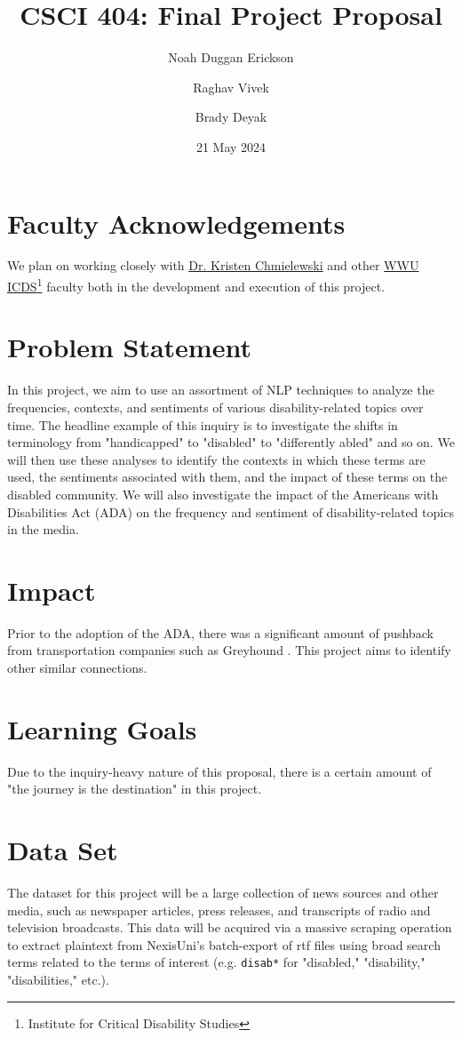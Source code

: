 \documentclass[letterpaper, twoside]{article}
\title{CSCI 404: Final Project Proposal}
\author{Noah Duggan Erickson \and Raghav Vivek \and Brady Deyak}
\date{21 May 2024}
\begin{document}
\maketitle

\section*{Faculty Acknowledgements}
We plan on working closely with \href{https://chss.wwu.edu/chmielk}{Dr. Kristen Chmielewski} and other \href{https://wp.wwu.edu/disabilitycollaborative/people/}{WWU ICDS\footnote{Institute for Critical Disability Studies} faculty} both in the development and execution of this project.

\section{Problem Statement}
In this project, we aim to use an assortment of NLP techniques to analyze the frequencies, contexts, and sentiments of various disability-related topics over time. The headline example of this inquiry is to investigate the shifts in terminology from "handicapped" to "disabled" to "differently abled" and so on. We will then use these analyses to identify the contexts in which these terms are used, the sentiments associated with them, and the impact of these terms on the disabled community. We will also investigate the impact of the Americans with Disabilities Act (ADA) on the frequency and sentiment of disability-related topics in the media.
\section{Impact}
Prior to the adoption of the ADA, there was a significant amount of pushback from transportation companies such as Greyhound \cite{grey-ada}. This project aims to identify other similar connections.
\section{Learning Goals}
Due to the inquiry-heavy nature of this proposal, there is a certain amount of "the journey is the destination" in this project.
\section{Data Set} \label{sec:data}
The dataset for this project will be a large collection of news sources and other media, such as newspaper articles, press releases, and transcripts of radio and television broadcasts. This data will be acquired via a massive scraping operation to extract plaintext from NexisUni's batch-export of rtf files using broad search terms related to the terms of interest (e.g. \texttt{disab*} for "disabled," "disability," "disabilities," etc.).
\end{document}
